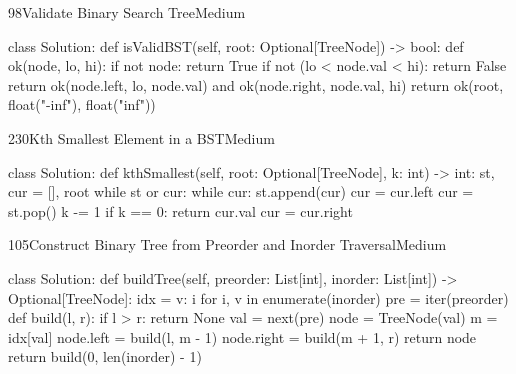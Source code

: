 \begin{problem}{98}{Validate Binary Search Tree}{Medium}
\begin{code}
class Solution:
    def isValidBST(self, root: Optional[TreeNode]) -> bool:
        def ok(node, lo, hi):
            if not node:
                return True
            if not (lo < node.val < hi):
                return False
            return ok(node.left, lo, node.val) and ok(node.right, node.val, hi)
        return ok(root, float("-inf"), float("inf"))
\end{code}
\end{problem}

\begin{problem}{230}{Kth Smallest Element in a BST}{Medium}
\begin{code}
class Solution:
    def kthSmallest(self, root: Optional[TreeNode], k: int) -> int:
        st, cur = [], root
        while st or cur:
            while cur:
                st.append(cur)
                cur = cur.left
            cur = st.pop()
            k -= 1
            if k == 0:
                return cur.val
            cur = cur.right
\end{code}
\end{problem}

\begin{problem}{105}{Construct Binary Tree from Preorder and Inorder Traversal}{Medium}
\begin{code}
class Solution:
    def buildTree(self, preorder: List[int], inorder: List[int]) -> Optional[TreeNode]:
        idx = {v: i for i, v in enumerate(inorder)}
        pre = iter(preorder)
        def build(l, r):
            if l > r:
                return None
            val = next(pre)
            node = TreeNode(val)
            m = idx[val]
            node.left = build(l, m - 1)
            node.right = build(m + 1, r)
            return node
        return build(0, len(inorder) - 1)
\end{code}
\end{problem}

